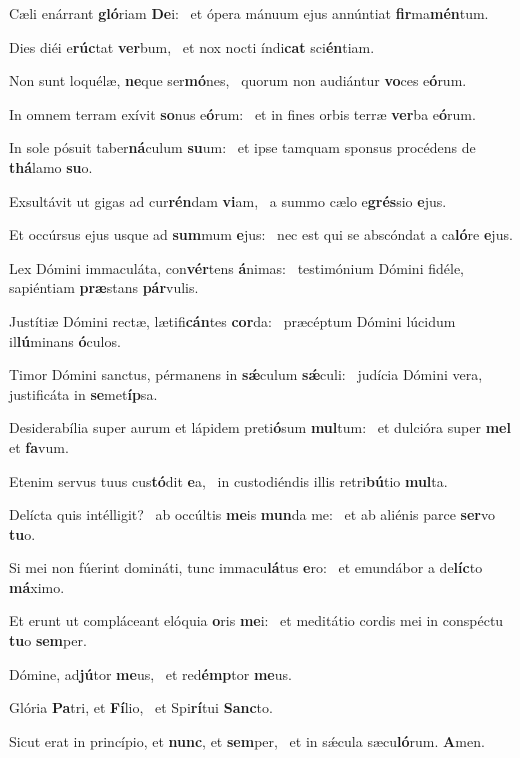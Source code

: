 \item Cæli enárrant \textbf{gló}riam \textbf{De}i:~\psstar{} et ópera mánuum ejus annúntiat \textbf{fir}ma\textbf{mén}tum.
\item Dies diéi e\textbf{rúc}tat \textbf{ver}bum,~\psstar{} et nox nocti índi\textbf{cat} sci\textbf{én}tiam.
\item Non sunt loquélæ, \textbf{ne}que ser\textbf{mó}nes,~\psstar{} quorum non audiántur \textbf{vo}ces e\textbf{ó}rum.
\item In omnem terram exívit \textbf{so}nus e\textbf{ó}rum:~\psstar{} et in fines orbis terræ \textbf{ver}ba e\textbf{ó}rum.
\item In sole pósuit taber\textbf{ná}culum \textbf{su}um:~\psstar{} et ipse tamquam sponsus procédens de \textbf{thá}lamo \textbf{su}o.
\item Exsultávit ut gigas ad cur\textbf{rén}dam \textbf{vi}am,~\psstar{} a summo cælo e\textbf{grés}sio \textbf{e}jus.
\item Et occúrsus ejus usque ad \textbf{sum}mum \textbf{e}jus:~\psstar{} nec est qui se abscóndat a ca\textbf{ló}re \textbf{e}jus.
\item Lex Dómini immaculáta, con\textbf{vér}tens \textbf{á}nimas:~\psstar{} testimónium Dómini fidéle, sapiéntiam \textbf{præ}stans \textbf{pár}vulis.
\item Justítiæ Dómini rectæ, lætifi\textbf{cán}tes \textbf{cor}da:~\psstar{} præcéptum Dómini lúcidum il\textbf{lú}minans \textbf{ó}culos.
\item Timor Dómini sanctus, pérmanens in \textbf{sǽ}culum \textbf{sǽ}culi:~\psstar{} judícia Dómini vera, justificáta in \textbf{se}met\textbf{íp}sa.
\item Desiderabília super aurum et lápidem preti\textbf{ó}sum \textbf{mul}tum:~\psstar{} et dulcióra super \textbf{mel} et \textbf{fa}vum.
\item Etenim servus tuus cus\textbf{tó}dit \textbf{e}a,~\psstar{} in custodiéndis illis retri\textbf{bú}tio \textbf{mul}ta.
\item Delícta quis intélligit?~\pscross{} ab occúltis \textbf{me}is \textbf{mun}da me:~\psstar{} et ab aliénis parce \textbf{ser}vo \textbf{tu}o.
\item Si mei non fúerint domináti, tunc immacu\textbf{lá}tus \textbf{e}ro:~\psstar{} et emundábor a de\textbf{líc}to \textbf{má}ximo.
\item Et erunt ut compláceant elóquia \textbf{o}ris \textbf{me}i:~\psstar{} et meditátio cordis mei in conspéctu \textbf{tu}o \textbf{sem}per.
\item Dómine, ad\textbf{jú}tor \textbf{me}us,~\psstar{} et red\textbf{émp}tor \textbf{me}us.
\item Glória \textbf{Pa}tri, et \textbf{Fí}lio,~\psstar{} et Spi\textbf{rí}tui \textbf{Sanc}to.
\item Sicut erat in princípio, et \textbf{nunc}, et \textbf{sem}per,~\psstar{} et in sǽcula sæcu\textbf{ló}rum. \textbf{A}men.
